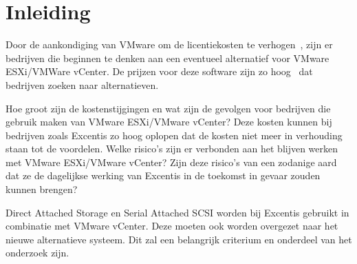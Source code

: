 


% 

\section{Inleiding}%
\label{sec:inleiding}

Door de aankondiging van VMware om de licentiekosten te verhogen~\autocite{device42_2024}, zijn er bedrijven die beginnen te denken aan een eventueel alternatief voor VMware ESXi/VMWare vCenter.
De prijzen voor deze software zijn zo hoog~\autocite{Hale2024} dat bedrijven zoeken naar alternatieven.

Hoe groot zijn de kostenstijgingen en wat zijn de gevolgen voor bedrijven die gebruik maken van VMware ESXi/VMware vCenter?
Deze kosten kunnen bij bedrijven zoals Excentis zo hoog oplopen dat de kosten niet meer in verhouding staan tot de voordelen.
Welke risico's zijn er verbonden aan het blijven werken met VMware ESXi/VMware vCenter?
Zijn deze risico’s van een zodanige aard dat ze de dagelijkse werking van Excentis in de toekomst in gevaar zouden kunnen brengen?

Direct Attached Storage en Serial Attached SCSI worden bij Excentis gebruikt in combinatie met VMware vCenter.
Deze moeten ook worden overgezet naar het nieuwe alternatieve systeem. Dit zal een belangrijk criterium en onderdeel van het onderzoek zijn.

